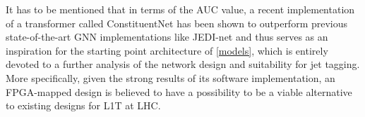 It has to be mentioned that in terms of the AUC value, a recent implementation of a transformer called ConstituentNet \cite{3-yuan2021msc} has been shown to outperform previous state-of-the-art GNN implementations like JEDI-net \cite{9-newman2019jedi-net:} and thus serves as an inspiration for the starting point architecture of \cref{models}, which is entirely devoted to a further analysis of the network design and suitability for jet tagging. More specifically, given the strong results of its software implementation, an FPGA-mapped design is believed to have a possibility to be a viable alternative to existing designs for L1T at LHC.